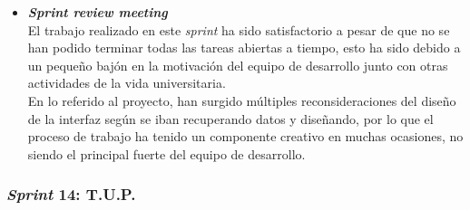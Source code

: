 \begin{itemize}
\item \textbf{\textit{Sprint review meeting}}\\
El trabajo realizado en este \textit{sprint} ha sido satisfactorio a pesar de que no se han podido terminar todas las tareas abiertas a tiempo, esto ha sido debido a un pequeño bajón en la motivación del equipo de desarrollo junto con otras actividades de la vida universitaria. \\
En lo referido al proyecto, han surgido múltiples reconsideraciones del diseño de la interfaz según se iban recuperando datos y diseñando, por lo que el proceso de trabajo ha tenido un componente creativo en muchas ocasiones, no siendo el principal fuerte del equipo de desarrollo.
\end{itemize}

\subsubsection{\textit{Sprint} 14: T.U.P.}
